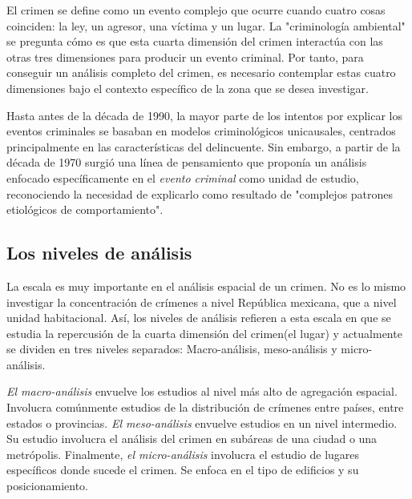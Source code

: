 El crimen se define como un evento complejo que ocurre cuando cuatro cosas coinciden: la ley, un agresor, una víctima y un lugar. La "criminología ambiental" se pregunta cómo es que esta cuarta dimensión del crimen interactúa con las otras tres dimensiones para producir un evento criminal\cite{brantingham1981}. Por tanto, para conseguir un análisis completo del crimen, es necesario contemplar estas cuatro dimensiones bajo el contexto específico de la zona que se desea investigar.

Hasta antes de la década de 1990, la mayor parte de los intentos por explicar los eventos criminales se basaban en modelos criminológicos unicausales, centrados principalmente en las características del delincuente. Sin embargo, a partir de la década de 1970 surgió una línea de pensamiento que proponía un análisis enfocado específicamente en el \textit{evento criminal} como unidad de estudio, reconociendo la necesidad de explicarlo como resultado de "complejos patrones etiológicos de comportamiento"\cite{brantingham1993}.

\subsection{Los niveles de análisis}
La escala es muy importante en el análisis espacial de un crimen. No es lo mismo investigar la concentración de crímenes a nivel República mexicana, que a nivel unidad habitacional. Así, los niveles de análisis refieren a esta escala en que se estudia la repercusión de la cuarta dimensión del crimen(el lugar) y actualmente se dividen en tres niveles separados: Macro-análisis, meso-análisis y micro-análisis.

\textit{El macro-análisis} envuelve los estudios al nivel más alto de agregación espacial. Involucra comúnmente estudios de la distribución de crímenes entre países, entre estados o provincias. \textit{El meso-análisis} envuelve estudios en un nivel intermedio. Su estudio involucra el análisis del crimen en subáreas de una ciudad o una metrópolis. Finalmente, \textit{el micro-análisis} involucra el estudio de lugares específicos donde sucede el crimen. Se enfoca en el tipo de edificios y su posicionamiento\cite{brantingham1981}.

